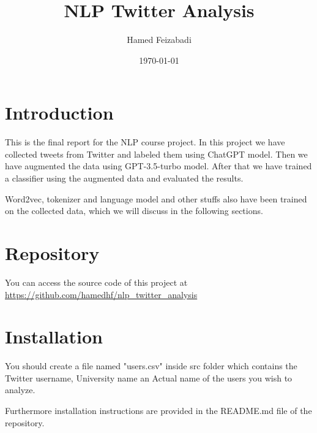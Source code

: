 \documentclass[12pt, letterpaper]{article}
\title{NLP Twitter Analysis}
\author{Hamed Feizabadi}
\date{\today}
\begin{document}
    \blindtext
    \maketitle
    \tableofcontents
    \newpage


    \section{Introduction}\label{sec:introduction}
    This is the final report for the NLP course project. In this project we have collected tweets from Twitter and labeled them using ChatGPT model. Then we have augmented the data using GPT-3.5-turbo model. After that we have trained a classifier using the augmented data and evaluated the results. 
    
    Word2vec, tokenizer and language model and other stuffs also have been trained on the collected data, which we will discuss in the following sections.


    \section{Repository}\label{sec:repository}
    You can access the source code of this project at \url{https://github.com/hamedhf/nlp_twitter_analysis}

    \section{Installation}\label{sec:installation}
    You should create a file named "users.csv" inside src folder which contains the Twitter username, University name an Actual name of the users you wish to analyze. 
    
    Furthermore installation instructions are provided in the README.md file of the repository.
\end{document}
